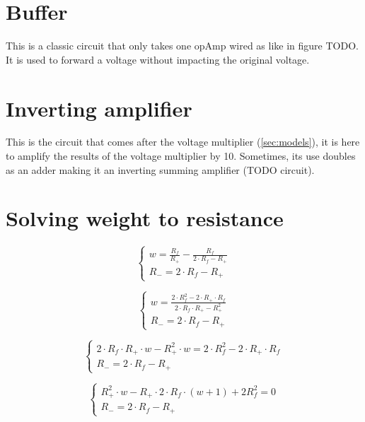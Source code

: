 \label{ap:a}

\section{Buffer}\label{apsec:buffer}

This is a classic circuit that only takes one \ac{opAmp} wired as like in figure TODO. It is used to forward a voltage without impacting the original voltage.

\section{Inverting amplifier}\label{apsec:invAmp}

This is the circuit that comes after the voltage multiplier (\cref{sec:models}), it is here to amplify the results of the voltage multiplier by 10. Sometimes, its use doubles as an adder making it an inverting summing amplifier (TODO circuit).

\section{Solving weight to resistance}\label{apsec:wei2res}

\begin{equation}\label{eq:wei2res3}
  \begin{cases}
    w=\frac{R_f}{R_+}-\frac{R_f}{2\cdot R_f -R_+}\\
    R_-=2\cdot R_f -R_+
  \end{cases}
\end{equation}


\begin{equation}\label{eq:wei2res4}
  \begin{cases}
    w=\frac{2\cdot R_f^2-2\cdot R_+\cdot R_f}{2\cdot R_f\cdot R_+ -R_+^2}\\
    R_-=2\cdot R_f -R_+
  \end{cases}
\end{equation}

\begin{equation}\label{eq:wei2res5}
  \begin{cases}
    2\cdot R_f\cdot R_+\cdot w -R_+^2\cdot w=2\cdot R_f^2-2\cdot R_+\cdot R_f\\
    R_-=2\cdot R_f -R_+
  \end{cases}
\end{equation}

\begin{equation}\label{eq:wei2res6}
  \begin{cases}
    R_+^2\cdot w - R_+\cdot 2\cdot R_f \cdot(w+1) + 2R_f^2 = 0\\
    R_-=2\cdot R_f -R_+
  \end{cases}
\end{equation}

